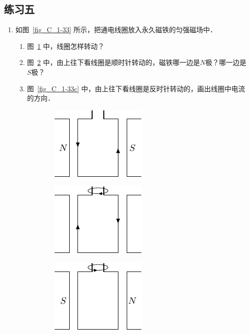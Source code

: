 \subsection*{练习五}
\begin{enumerate}
    \item 如图~\ref{fig_C_1-33} 所示，把通电线圈放入永久磁铁的匀强磁场中．
    \begin{enumerate}
        \item 图~\ref{fig_C_1-33a} 中，线圈怎样转动？
        \item 图~\ref{fig_C_1-33b} 中，由上往下看线圈是顺时针转动的，磁铁哪一边是$N$极？哪一边是$S$极？
        \item 图~\ref{fig_C_1-33c} 中，由上往下看线圈是反时针转动的，画出线圈中电流的方向．
    \end{enumerate}
    \begin{figure}[htbp]
    	\centering
    	\begin{subfigure}{0.3\linewidth}
    		\centering
    		\includegraphics{fig/C/1-33a.pdf}
    		\caption{}\label{fig_C_1-33a}
    	\end{subfigure}
    	\hfil
    	\begin{subfigure}{0.3\linewidth}
    		\centering
    		\includegraphics{fig/C/1-33b.pdf}
    		\caption{}\label{fig_C_1-33b}
    	\end{subfigure}
    	\hfil
    	\begin{subfigure}{0.3\linewidth}
    		\centering
    		\includegraphics{fig/C/1-33c.pdf}

\end{subfigure}
\end{figure}
\end{enumerate}
